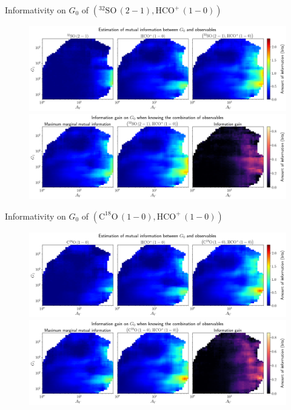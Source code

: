 \documentclass{beamer}
\begin{document}
\begin{frame}{Informativity on $G_0$ of $\left(\mathrm{^{32}SO\,(2-1)},\mathrm{HCO^+\,(1-0)}\right)$}
    \begin{figure}
        \centering
        \includegraphics[width=0.95\linewidth]{../mi/g0__32so21_hcop10_mi.png}
        \vfill
        \includegraphics[width=0.95\linewidth]{../mi/g0__32so21_hcop10_mi_gain.png}
    \end{figure}
\end{frame}

\begin{frame}{Informativity on $G_0$ of $\left(\mathrm{C^{18}O\,(1-0)},\mathrm{HCO^+\,(1-0)}\right)$}
    \begin{figure}
        \centering
        \includegraphics[width=0.95\linewidth]{../mi/g0__c18o10_hcop10_mi.png}
        \vfill
        \includegraphics[width=0.95\linewidth]{../mi/g0__c18o10_hcop10_mi_gain.png}
    \end{figure}
\end{frame}
\end{document}
